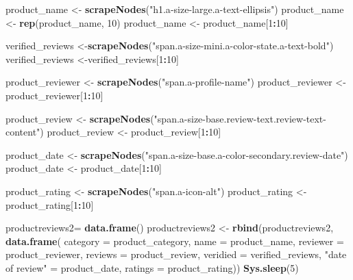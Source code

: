 \documentclass[
]{article}
\newenvironment{Shaded}{\begin{snugshade}}{\end{snugshade}}
\newcommand{\AttributeTok}[1]{\textcolor[rgb]{0.13,0.29,0.53}{#1}}
\newcommand{\DecValTok}[1]{\textcolor[rgb]{0.00,0.00,0.81}{#1}}
\newcommand{\FunctionTok}[1]{\textcolor[rgb]{0.13,0.29,0.53}{\textbf{#1}}}
\newcommand{\NormalTok}[1]{#1}
\newcommand{\OtherTok}[1]{\textcolor[rgb]{0.56,0.35,0.01}{#1}}
\newcommand{\SpecialCharTok}[1]{\textcolor[rgb]{0.81,0.36,0.00}{\textbf{#1}}}
\newcommand{\StringTok}[1]{\textcolor[rgb]{0.31,0.60,0.02}{#1}}
\begin{document}
\begin{Shaded}
\begin{Highlighting}[]
\NormalTok{  product\_name }\OtherTok{\textless{}{-}} \FunctionTok{scrapeNodes}\NormalTok{(}\StringTok{"h1.a{-}size{-}large.a{-}text{-}ellipsis"}\NormalTok{)}
\NormalTok{  product\_name }\OtherTok{\textless{}{-}} \FunctionTok{rep}\NormalTok{(product\_name, }\DecValTok{10}\NormalTok{)}
\NormalTok{  product\_name }\OtherTok{\textless{}{-}}\NormalTok{ product\_name[}\DecValTok{1}\SpecialCharTok{:}\DecValTok{10}\NormalTok{]}
  
\NormalTok{  verified\_reviews }\OtherTok{\textless{}{-}}\FunctionTok{scrapeNodes}\NormalTok{(}\StringTok{"span.a{-}size{-}mini.a{-}color{-}state.a{-}text{-}bold"}\NormalTok{)}
\NormalTok{  verified\_reviews }\OtherTok{\textless{}{-}}\NormalTok{verified\_reviews[}\DecValTok{1}\SpecialCharTok{:}\DecValTok{10}\NormalTok{]}
  
\NormalTok{  product\_reviewer }\OtherTok{\textless{}{-}} \FunctionTok{scrapeNodes}\NormalTok{(}\StringTok{"span.a{-}profile{-}name"}\NormalTok{)}
\NormalTok{  product\_reviewer }\OtherTok{\textless{}{-}}\NormalTok{ product\_reviewer[}\DecValTok{1}\SpecialCharTok{:}\DecValTok{10}\NormalTok{]}
  
\NormalTok{  product\_review }\OtherTok{\textless{}{-}} \FunctionTok{scrapeNodes}\NormalTok{(}\StringTok{"span.a{-}size{-}base.review{-}text.review{-}text{-}content"}\NormalTok{)}
\NormalTok{  product\_review }\OtherTok{\textless{}{-}}\NormalTok{ product\_review[}\DecValTok{1}\SpecialCharTok{:}\DecValTok{10}\NormalTok{]}
  
\NormalTok{  product\_date }\OtherTok{\textless{}{-}} \FunctionTok{scrapeNodes}\NormalTok{(}\StringTok{"span.a{-}size{-}base.a{-}color{-}secondary.review{-}date"}\NormalTok{)}
\NormalTok{  product\_date }\OtherTok{\textless{}{-}}\NormalTok{ product\_date[}\DecValTok{1}\SpecialCharTok{:}\DecValTok{10}\NormalTok{]}
  
\NormalTok{  product\_rating }\OtherTok{\textless{}{-}} \FunctionTok{scrapeNodes}\NormalTok{(}\StringTok{"span.a{-}icon{-}alt"}\NormalTok{)}
\NormalTok{  product\_rating }\OtherTok{\textless{}{-}}\NormalTok{ product\_rating[}\DecValTok{1}\SpecialCharTok{:}\DecValTok{10}\NormalTok{]}
  
\NormalTok{  productreviews2}\OtherTok{=} \FunctionTok{data.frame}\NormalTok{()}
\NormalTok{  productreviews2 }\OtherTok{\textless{}{-}} \FunctionTok{rbind}\NormalTok{(productreviews2, }\FunctionTok{data.frame}\NormalTok{(}
                      \AttributeTok{category =}\NormalTok{ product\_category,}
                      \AttributeTok{name =}\NormalTok{ product\_name,}
                      \AttributeTok{reviewer =}\NormalTok{ product\_reviewer,}
                      \AttributeTok{reviews =}\NormalTok{ product\_review,}
                      \AttributeTok{veridied =}\NormalTok{ verified\_reviews,}
                      \StringTok{"date of review"} \OtherTok{=}\NormalTok{ product\_date,}
                      \AttributeTok{ratings =}\NormalTok{ product\_rating))}
  \FunctionTok{Sys.sleep}\NormalTok{(}\DecValTok{5}\NormalTok{)}
  

\end{Highlighting}
\end{Shaded}
\end{document}
